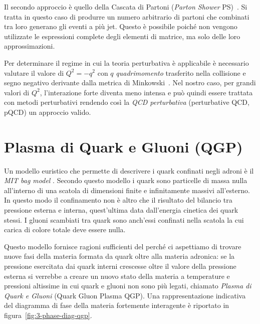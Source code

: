        Il secondo approccio è quello della Cascata di Partoni (\textit{Parton Shower} PS)~\cite{Bambah_1989}. Si tratta in questo caso di produrre un numero arbitrario di partoni che combinati tra loro generano gli eventi a più jet. Questo è possibile poiché non vengono utilizzate le espressioni complete degli elementi di matrice, ma solo delle loro approssimazioni.

        Per determinare il regime in cui la teoria perturbativa è applicabile è necessario valutare il valore di $Q^2 = - q^2$ con $q$ \textit{quadrimomento} trasferito nella collisione e segno negativo derivante dalla metrica di Minkowski~\cite{Altarelli_2004}. Nel nostro caso, per grandi valori di $Q^2$, l'interazione forte diventa meno intensa e può quindi essere trattata con metodi perturbativi rendendo così la \textit{QCD perturbativa} (perturbative QCD, pQCD) un approccio valido.

\newpage

\section{Plasma di Quark e Gluoni (QGP)}
\label{sec:QGP}
    Un modello euristico che permette di descrivere i quark confinati negli adroni è il \textit{MIT bag model} \cite{Wong_1994}. Secondo questo modello i quark sono particelle di massa nulla all'interno di una scatola di dimensioni finite e infinitamente massivi all'esterno. In questo modo il confinamento non è altro che il risultato del bilancio tra pressione esterna e interna, quest'ultima data dall'energia cinetica dei quark stessi. I gluoni scambiati tra quark sono anch'essi confinati nella scatola la cui carica di colore totale deve essere nulla.
    
    Questo modello fornisce ragioni sufficienti del perché ci aspettiamo di trovare nuove fasi della materia formata da quark oltre alla materia adronica: se la pressione esercitata dai quark interni crescesse oltre il valore della pressione esterna si verrebbe a creare un nuovo stato della materia a temperature e pressioni altissime in cui quark e gluoni non sono più legati, chiamato \textit{Plasma di Quark e Gluoni} (Quark Gluon Plasma QGP). Una rappresentazione indicativa del diagramma di fase della materia fortemente interagente è riportato in figura~\ref{fig:3-phase-diag-qgp}.
    
